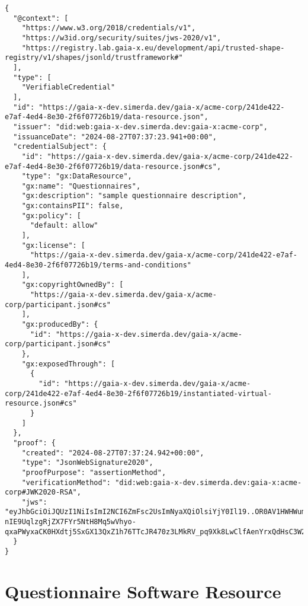\begin{verbatim}
{
  "@context": [
    "https://www.w3.org/2018/credentials/v1",
    "https://w3id.org/security/suites/jws-2020/v1",
    "https://registry.lab.gaia-x.eu/development/api/trusted-shape-registry/v1/shapes/jsonld/trustframework#"
  ],
  "type": [
    "VerifiableCredential"
  ],
  "id": "https://gaia-x-dev.simerda.dev/gaia-x/acme-corp/241de422-e7af-4ed4-8e30-2f6f07726b19/data-resource.json",
  "issuer": "did:web:gaia-x-dev.simerda.dev:gaia-x:acme-corp",
  "issuanceDate": "2024-08-27T07:37:23.941+00:00",
  "credentialSubject": {
    "id": "https://gaia-x-dev.simerda.dev/gaia-x/acme-corp/241de422-e7af-4ed4-8e30-2f6f07726b19/data-resource.json#cs",
    "type": "gx:DataResource",
    "gx:name": "Questionnaires",
    "gx:description": "sample questionnaire description",
    "gx:containsPII": false,
    "gx:policy": [
      "default: allow"
    ],
    "gx:license": [
      "https://gaia-x-dev.simerda.dev/gaia-x/acme-corp/241de422-e7af-4ed4-8e30-2f6f07726b19/terms-and-conditions"
    ],
    "gx:copyrightOwnedBy": [
      "https://gaia-x-dev.simerda.dev/gaia-x/acme-corp/participant.json#cs"
    ],
    "gx:producedBy": {
      "id": "https://gaia-x-dev.simerda.dev/gaia-x/acme-corp/participant.json#cs"
    },
    "gx:exposedThrough": [
      {
        "id": "https://gaia-x-dev.simerda.dev/gaia-x/acme-corp/241de422-e7af-4ed4-8e30-2f6f07726b19/instantiated-virtual-resource.json#cs"
      }
    ]
  },
  "proof": {
    "created": "2024-08-27T07:37:24.942+00:00",
    "type": "JsonWebSignature2020",
    "proofPurpose": "assertionMethod",
    "verificationMethod": "did:web:gaia-x-dev.simerda.dev:gaia-x:acme-corp#JWK2020-RSA",
    "jws": "eyJhbGciOiJQUzI1NiIsImI2NCI6ZmFsc2UsImNyaXQiOlsiYjY0Il19..OR0AV1HWHWum6KD6s9elCZemujCKe6G_y8CdWSxM5gl7WPD0pIxYuhPJaHVoZxPNuC7c_89BBwrnFtd8tVrMu9Z1cJthM7nuDZopck2GavnZtr9445HxsaEx5hPFsOfhxVHntb95Hqp4qAO7JhZTPU5MpDuBMivJ2v7_HCKuyjYTKo-nIE9UqlzgRjZX7FYr5NtH8Mq5wVhyo-qxaPWyxaCK0HXdtj5SxGX13QxZ1h76TTcJR470z3LMkRV_pq9Xk8LwClfAenYrxQdHsC3W2djfLeWuNPjkkJIhHtffAjJA9y816WCSHHPRzRuh8mX5ZjazVgqvqyEX2G3QuTcEfA"
  }
}
\end{verbatim}


\section{Questionnaire Software Resource}

